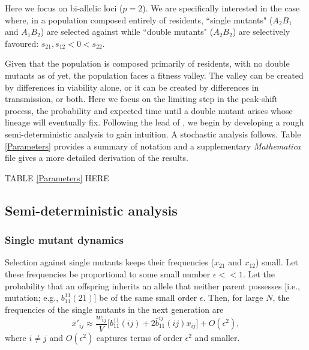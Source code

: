 \documentclass[review,3p,authoryear]{elsarticle}
\begin{document}
Here we focus on bi-allelic loci ($p=2$).
We are specifically interested in the case where, in a population composed entirely of residents, ``single mutants" ($A_2B_1$ and $A_1B_2$) are selected against while ``double mutants" ($A_2B_2$) are selectively favoured: $s_{21}, s_{12} < 0 < s_{22}$.


Given that the population is composed primarily of residents, with no double mutants as of yet,
the population faces a fitness valley.
The valley can be created by differences in viability alone, or it can be created by differences in transmission, or both.
Here we focus on the limiting step in the peak-shift process, the probability and expected time until a double mutant arises whose lineage will eventually fix.
Following the lead of \cite{Christiansen1998}, we begin by developing a rough semi-deterministic analysis to gain intuition.
A stochastic analysis follows.
Table \ref{Parameters} provides a summary of notation and a supplementary \textit{Mathematica} file gives a more detailed derivation of the results.

TABLE \ref{Parameters} HERE

\subsection{Semi-deterministic analysis}

\subsubsection{Single mutant dynamics}

Selection against single mutants keeps their frequencies ($x_{21}$ and $x_{12}$) small.
Let these frequencies be proportional to some small number $\epsilon<<1$.
Let the probability that an offspring inherits an allele that neither parent possesses [i.e., mutation; e.g., $b_{11}^{11}(21)$] be of the same small order $\epsilon$.
Then, for large $N$, the frequencies of the single mutants in the next generation are 
\begin{equation}\label{xMprime}
x'_{ij} \approx \frac{w_{ij}}{V} \Big[b_{11}^{11}(ij) + 2\bar{b}_{11}^{ij}(ij) x_{ij}\Big] + O(\epsilon^2),
\end{equation}
where $i\neq j$ and $O(\epsilon^2)$ captures terms of order $\epsilon^2$ and smaller.
\end{document}
